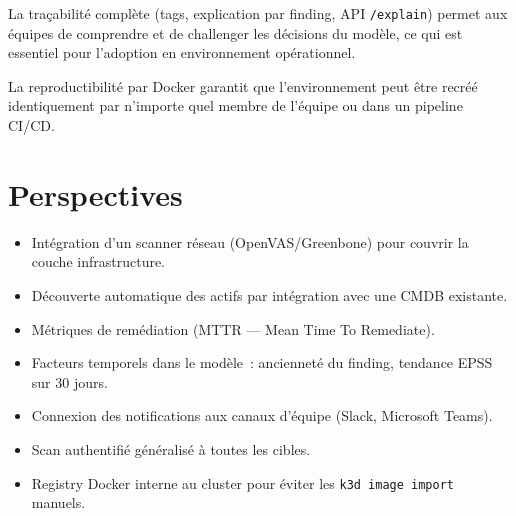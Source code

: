 \documentclass[12pt,a4paper]{report}
\begin{document}
La traçabilité complète (tags, explication par finding, API \texttt{/explain}) permet aux équipes de comprendre et de challenger les décisions du modèle, ce qui est essentiel pour l'adoption en environnement opérationnel.

La reproductibilité par Docker garantit que l'environnement peut être recréé identiquement par n'importe quel membre de l'équipe ou dans un pipeline CI/CD.

\section{Perspectives}
\begin{itemize}[nosep]
    \item Intégration d'un scanner réseau (OpenVAS/Greenbone) pour couvrir la couche infrastructure.
    \item Découverte automatique des actifs par intégration avec une CMDB existante.
    \item Métriques de remédiation (MTTR --- Mean Time To Remediate).
    \item Facteurs temporels dans le modèle~: ancienneté du finding, tendance EPSS sur 30 jours.
    \item Connexion des notifications aux canaux d'équipe (Slack, Microsoft Teams).
    \item Scan authentifié généralisé à toutes les cibles.
    \item Registry Docker interne au cluster pour éviter les \texttt{k3d image import} manuels.
\end{itemize}
\end{document}
